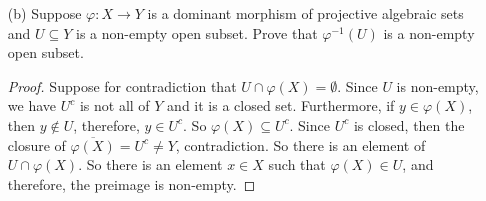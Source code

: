 \documentclass{article}
\begin{document}
\begin{itemize}
\begin{proof}
                (Surjectivity) Suppose that 
                    \begin{equation*}
                        \dfrac{a_{0} + a_{1}x + \cdots + a_{ d}x^{d}}{b_{0} + b_{1}x + \cdots + b_{ e}x^{e}} \in k( x)
                    \end{equation*}
                We can homogenize the denominator and numerator:
                    \begin{equation*}
                        F^{\prime}(x, y) = a_{0}y^{d} + a_{1}xy^{d - 1} + \cdots + a_{ d}x^{d}
                    \end{equation*}
                and
                    \begin{equation*}
                        G^{\prime}(x, y) = b_{0}y^{e} + b_{1}xy^{e - 1} + \cdots + b_{ e}x^{e}
                    \end{equation*}
                If the degree of $G^{\prime}$ is greater than that of $F^{\prime}$, we just multiply $F^{\prime}$ by $y^{e - d}$. So $y^{e - d}F(x, y)$ has the same degree as $G^{\prime}$. Then
                    \begin{equation*}
                        \varphi \left(\dfrac{y^{e - d}F^{\prime}(x, y)}{G^{\prime}(x, y)}\right) = \dfrac{F^{\prime}(x, 1)}{G^{\prime}(x, 1)} = \dfrac{a_{0} + a_{1}x + \cdots + a_{ d}x^{d}}{b_{0} + b_{1}x + \cdots + b_{ e}x^{e}}
                    \end{equation*}
                On the other hand if the degree of $G^{\prime}$ is less than that of $F^{\prime}$, then we can multiply $G^{\prime}(x, y)$ by $y^{d - e}$ to get:
                    \begin{equation*}
                        \varphi \left(\dfrac{F^{\prime}(x, y)}{y^{d - e}G^{\prime}(x, y)}\right) = \dfrac{F^{\prime}(x, y)}{G^{\prime}(x, y)} = \dfrac{a_{0} + a_{1}x + \cdots + a_{ d}x^{d}}{b_{0} + b_{1}x + \cdots + b_{ e}x^{e}}
                    \end{equation*}
                So we have an element of the preimage.
            \end{proof}

        Optional: generalize this to an isomorphism $k(\mathbb{P}^{n}) \rightarrow k(x_{1}, \ldots, x_{n})$.

        \item [(b)] Suppose $\varphi : X \rightarrow Y$ is a dominant morphism of projective algebraic sets and $U \subseteq Y$ is a non-empty open subset. Prove that $\varphi^{-1}(U)$ is a non-empty open subset.
            \begin{proof}
                Suppose for contradiction that $U \cap \varphi  ( X) = \emptyset$. Since $U$ is non-empty, we have $U^{c}$ is not all of $Y$ and it is a closed set. Furthermore, if $y \in \varphi  ( X)$, then $y \notin U$, therefore, $y \in U^{ c}$. So $\varphi ( X) \subseteq U^{ c}$. Since $U^{c}$ is closed, then the closure of $\overline{\varphi ( X)} = U^{c} \neq Y$, contradiction. So there is an element of $U \cap \varphi  ( X)$. So there is an element $x \in X$ such that $\varphi ( X) \in U$, and therefore, the preimage is non-empty.
            \end{proof}
    \end{itemize}
\end{document}
